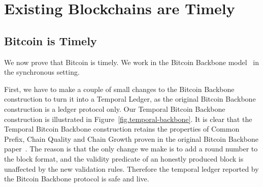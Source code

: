 \section{Existing Blockchains are Timely}


\subsection{Bitcoin is Timely}

We now prove that Bitcoin is timely. We work in the Bitcoin Backbone model~\cite{backbone}
in the synchronous setting. 

First, we have to make a couple of small changes to the Bitcoin Backbone construction to turn it
into a Temporal Ledger, as the original Bitcoin Backbone construction is a ledger protocol only.
Our Temporal Bitcoin Backbone construction is illustrated in Figure~\ref{fig.temporal-backbone}.
It is clear that the Temporal Bitcoin Backbone construction retains the properties of Common Prefix,
Chain Quality and Chain Growth proven in the original Bitcoin Backbone paper~\cite{backbone}.
The reason is that the only change we make is to add a round number to the block format, and
the validity predicate of an honestly produced block is unaffected by the new validation rules.
Therefore the temporal ledger reported by the Bitcoin Backbone protocol is safe and live.

